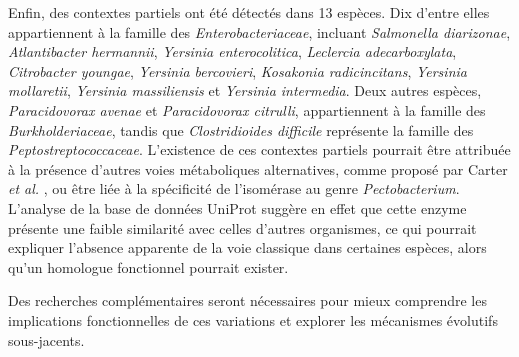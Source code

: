 \newpage

Enfin, des contextes partiels ont été détectés dans 13 espèces. Dix d’entre elles appartiennent à la famille des \textit{Enterobacteriaceae}, incluant \textit{Salmonella diarizonae}, \textit{Atlantibacter hermannii}, \textit{Yersinia enterocolitica}, \textit{Leclercia adecarboxylata}, \textit{Citrobacter youngae}, \textit{Yersinia bercovieri}, \textit{Kosakonia radicincitans}, \textit{Yersinia mollaretii}, \textit{Yersinia massiliensis} et \textit{Yersinia intermedia}. Deux autres espèces, \textit{Paracidovorax avenae} et \textit{Paracidovorax citrulli}, appartiennent à la famille des \textit{Burkholderiaceae}, tandis que \textit{Clostridioides difficile} représente la famille des \textit{Peptostreptococcaceae}. L’existence de ces contextes partiels pourrait être attribuée à la présence d’autres voies métaboliques alternatives, comme proposé par Carter \textit{et al.} \cite{carter_functional_2018}, ou être liée à la spécificité de l’isomérase au genre \textit{Pectobacterium}. L’analyse de la base de données UniProt \cite{the_uniprot_consortium_uniprot_2025} suggère en effet que cette enzyme présente une faible similarité avec celles d’autres organismes, ce qui pourrait expliquer l’absence apparente de la voie classique dans certaines espèces, alors qu’un homologue fonctionnel pourrait exister.

Des recherches complémentaires seront nécessaires pour mieux comprendre les implications fonctionnelles de ces variations et explorer les mécanismes évolutifs sous-jacents.

